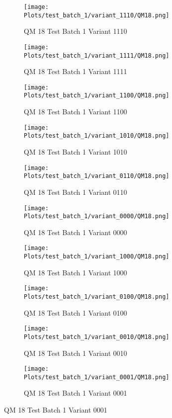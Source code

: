 \documentclass{DissertateFigs}
\begin{document}
\begin{figure}[t!]
    \begin{subfigure}{0.47\textwidth}
    \texttt{[image: Plots/test\_batch\_1/variant\_1110/QM18.png]}
    \caption{QM 18 Test Batch 1 Variant 1110}
    \end{subfigure}
    \begin{subfigure}{0.47\textwidth}
    \texttt{[image: Plots/test\_batch\_1/variant\_1111/QM18.png]}
    \caption{QM 18 Test Batch 1 Variant 1111}
    \end{subfigure}

\medskip

    \begin{subfigure}{0.47\textwidth}
    \texttt{[image: Plots/test\_batch\_1/variant\_1100/QM18.png]}
    \caption{QM 18 Test Batch 1 Variant 1100}
    \end{subfigure}
    \begin{subfigure}{0.47\textwidth}
    \texttt{[image: Plots/test\_batch\_1/variant\_1010/QM18.png]}
    \caption{QM 18 Test Batch 1 Variant 1010}
    \end{subfigure}

\medskip

    \begin{subfigure}{0.47\textwidth}
    \texttt{[image: Plots/test\_batch\_1/variant\_0110/QM18.png]}
    \caption{QM 18 Test Batch 1 Variant 0110}
    \end{subfigure}
    \begin{subfigure}{0.47\textwidth}
    \texttt{[image: Plots/test\_batch\_1/variant\_0000/QM18.png]}
    \caption{QM 18 Test Batch 1 Variant 0000}
    \end{subfigure}

\medskip

    \begin{subfigure}{0.47\textwidth}
    \texttt{[image: Plots/test\_batch\_1/variant\_1000/QM18.png]}
    \caption{QM 18 Test Batch 1 Variant 1000}
    \end{subfigure}
    \begin{subfigure}{0.47\textwidth}
    \texttt{[image: Plots/test\_batch\_1/variant\_0100/QM18.png]}
    \caption{QM 18 Test Batch 1 Variant 0100}
    \end{subfigure}

\medskip

    \begin{subfigure}{0.47\textwidth}
    \texttt{[image: Plots/test\_batch\_1/variant\_0010/QM18.png]}
    \caption{QM 18 Test Batch 1 Variant 0010}
    \end{subfigure}
    \begin{subfigure}{0.47\textwidth}
    \texttt{[image: Plots/test\_batch\_1/variant\_0001/QM18.png]}
    \caption{QM 18 Test Batch 1 Variant 0001}
    \end{subfigure}


\end{figure}
\end{document}
